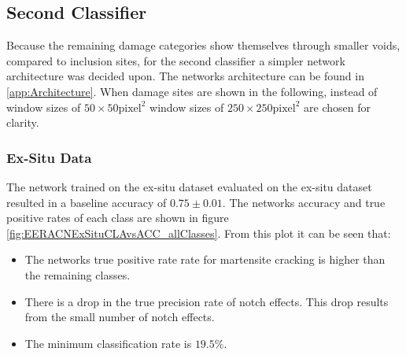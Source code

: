 \newpage
\subsection{Second Classifier}
Because the remaining damage categories show themselves through smaller voids, compared to inclusion sites, for the second classifier a simpler network architecture was decided upon. The networks architecture can be found in \ref{app:Architecture}. When damage sites are shown in the following, instead of window sizes of $50\times 50 \text{pixel}^2$ window sizes of $250\times 250 \text{pixel}^2$ are chosen for clarity.


%
%

\subsubsection{Ex-Situ Data}
The network trained on the ex-situ dataset evaluated on the ex-situ dataset resulted in a baseline accuracy of $0.75\pm0.01$. The networks accuracy and true positive rates of each class are shown in figure \ref{fig:EERACNExSituCLAvsACC_allClasses}. From this plot it can be seen that:
\begin{itemize}
\item The networks true positive rate rate for martensite cracking is higher than the remaining classes.
\item There is a drop in the true precision rate of notch effects. This drop results from the small number of notch effects.
\item The minimum classification rate is $19.5\%$. 
\end{itemize}

